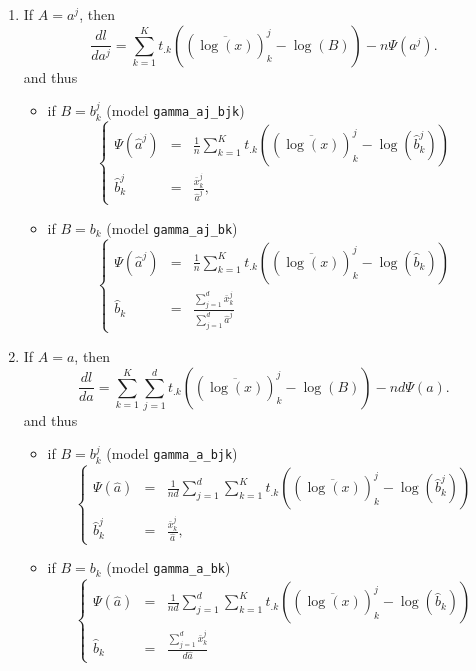 \documentclass[a4paper,10pt]{article}
\begin{document}
\begin{enumerate}
\item If $A = a^j$, then
$$
\frac{dl}{da^j} = \sum_{k=1}^K t_{.k} \left((\overline{\log(x)})^j_k - \log(B)\right) - n\Psi(a^j).
$$
and thus
\begin{itemize}
\item if $B=b^j_k$ (model \verb+gamma_aj_bjk+)
\begin{equation}\label{eq:mStep_aj_bjk}
\left\lbrace
\begin{array}{lcl}
\Psi(\hat{a}^j) & = & \frac{1}{n} \sum_{k=1}^K  t_{.k} \left( (\overline{\log(x)})^j_k - \log(\hat{b}^j_k) \right) \\
    \hat{b}^j_k & = & \frac{\bar{x}^j_k}{\hat{a}^j},
\end{array}
\right.
\end{equation}
\item  if $B=b_k$  (model \verb+gamma_aj_bk+)
\begin{equation}\label{eq:mStep_aj_bk}
\left\lbrace
\begin{array}{lcl}
\Psi(\hat{a}^j) & = & \frac{1}{n} \sum_{k=1}^K  t_{.k} \left( (\overline{\log(x)})^j_k - \log(\hat{b}_k) \right) \\
  \hat{b}_k     & = & \frac{\sum_{j=1}^d  \bar{x}^j_k}{\sum_{j=1}^d \hat{a}^j}
\end{array}
\right.
\end{equation}
\end{itemize}
\item If $A = a$, then
$$
\frac{dl}{da} = \sum_{k=1}^K \sum_{j=1}^d t_{.k} \left((\overline{\log(x)})^j_k - \log(B)\right) - nd\Psi(a).
$$
and thus
\begin{itemize}
\item if $B=b^j_k$ (model \verb+gamma_a_bjk+)
\begin{equation}\label{eq:mStep_a_bjk}
\left\lbrace
\begin{array}{lcl}
\Psi(\hat{a}) & = & \frac{1}{nd} \sum_{j=1}^d \sum_{k=1}^K  t_{.k} \left( (\overline{\log(x)})^j_k - \log(\hat{b}^j_k) \right) \\
  \hat{b}^j_k & = & \frac{\bar{x}^j_k}{\hat{a}},
\end{array}
\right.
\end{equation}
\item  if $B=b_k$  (model \verb+gamma_a_bk+)
\begin{equation}\label{eq:mStep_a_bk}
\left\lbrace
\begin{array}{lcl}
\Psi(\hat{a}) & = & \frac{1}{nd} \sum_{j=1}^d \sum_{k=1}^K  t_{.k} \left( (\overline{\log(x)})^j_k - \log(\hat{b}_k) \right) \\
  \hat{b}_k   & = & \frac{\sum_{j=1}^d  \bar{x}^j_k}{d \hat{a}}
\end{array}
\right.
\end{equation}
\end{itemize}
\end{enumerate}
\end{document}
